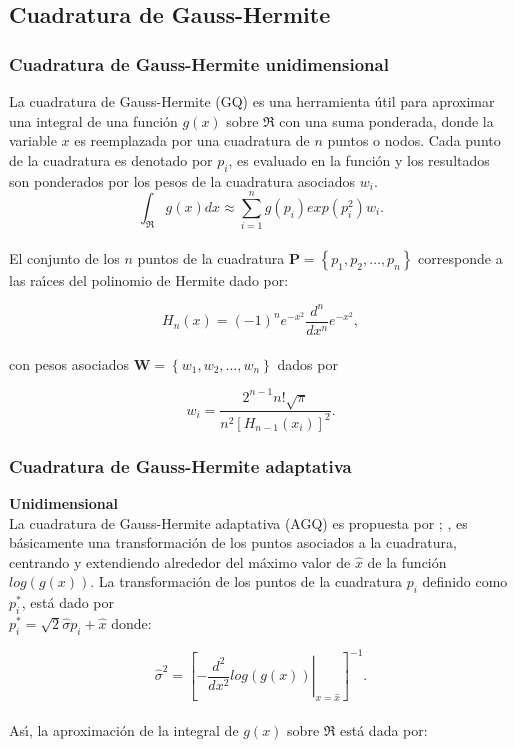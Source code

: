 \subsection{Cuadratura de Gauss-Hermite}\label{sec:Cuadratura}

\subsubsection{Cuadratura de Gauss-Hermite unidimensional}

La cuadratura de Gauss-Hermite (GQ) es una herramienta \'{u}til para aproximar una integral de una funci\'{o}n $g(x)$ sobre $\Re$ con una suma ponderada, donde la variable $x$ es reemplazada por una cuadratura de $n$ puntos o nodos. Cada punto de la cuadratura es denotado por $p_i$, es evaluado en la funci\'{o}n y los resultados son ponderados por los pesos de la cuadratura asociados $w_i$.
\[
\int_\Re{g(x)dx}\approx\sum_{i=1}^{n}{g(p_i)exp(p_i^2)w_i.}
\]
\\
El conjunto de los $n$ puntos de la cuadratura $\textbf{P}=\left\{p_1,p_2,\ldots,p_n\right\}$ corresponde a las ra\'{\i}ces del polinomio de Hermite dado por:

\[
H_n{(x)}=(-1)^ne^{-x^2}\frac{d^n}{dx^n}e^{-x^2},
\]
\\
con pesos asociados $\textbf{W}=\left\{w_1,w_2,\ldots,w_n\right\}$ dados por

\[
w_i=\frac{2^{n-1}n!\sqrt{\pi}}{n^2{[H_{n-1}(x_i)]}^2}.
\]

\subsubsection{Cuadratura de Gauss-Hermite adaptativa}

\textbf{Unidimensional\\}
La cuadratura de Gauss-Hermite adaptativa (AGQ) es propuesta por \cite{Liu1}; \citep{Pinheiro1}, es b\'{a}sicamente una transformaci\'{o}n de los puntos asociados a la cuadratura, centrando y extendiendo alrededor del m\'{a}ximo valor de $\hat{x}$ de la funci\'{o}n $log(g(x))$. La transformaci\'{o}n de los puntos de la cuadratura $p_i$ definido como $p_i^*$, est\'{a} dado por \\
$p_i^*=\sqrt{2}\hat{\sigma}p_i+\hat{x}$ donde:

\[
\hat{\sigma}^2={\left[\left. -\frac{d^2}{dx^2}log(g(x))\right|_{x=\hat{x}}\right]^{-1}}.
\]
\\
As\'{\i}, la aproximaci\'{o}n de la integral de $g(x)$ sobre $\Re$ est\'{a} dada por:

